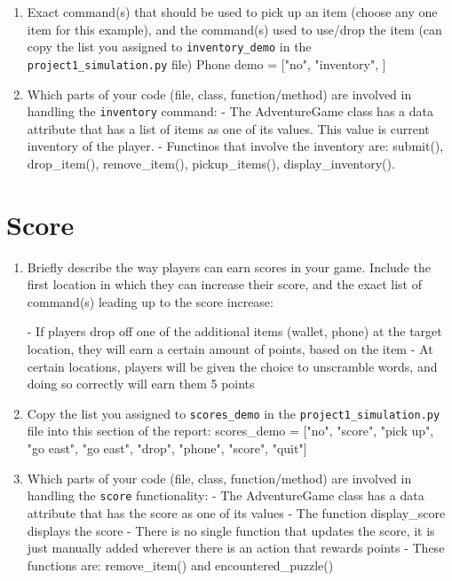\documentclass[11pt]{article}
\begin{document}
\begin{enumerate}
    \item Exact command(s) that should be used to pick up an item (choose any one item for this example), and the command(s) used to use/drop the item (can copy the list you assigned to \texttt{inventory\_demo} in the \texttt{project1\_simulation.py} file)
        Phone demo = ["no", "inventory", ]
    \item Which parts of your code (file, class, function/method) are involved in handling the \texttt{inventory} command:
        - The AdventureGame class has a data attribute that has a list of items as one of its values. This value is current inventory of the player.
        - Functinos that involve the inventory are: submit(), drop_item(), remove_item(), pickup_items(), display_inventory().
\end{enumerate}

\section*{Score}
\begin{enumerate}

    \item Briefly describe the way players can earn scores in your game. Include the first location in which they can increase their score, and the exact list of command(s) leading up to the score increase:

        - If players drop off one of the additional items (wallet, phone) at the target location, they will earn a certain
        amount of points, based on the item
        - At certain locations, players will be given the choice to unscramble words, and doing so correctly will earn them
        5 points

    \item Copy the list you assigned to \texttt{scores\_demo} in the \texttt{project1\_simulation.py} file into this section of the report:
        scores_demo = ["no", "score", "pick up", "go east", "go east", "drop", "phone", "score", "quit"]

    \item Which parts of your code (file, class, function/method) are involved in handling the \texttt{score} functionality:
        - The AdventureGame class has a data attribute that has the score as one of its values
        - The function display_score displays the score
        - There is no single function that updates the score, it is just manually added wherever there is an action that rewards points
        - These functions are: remove_item() and encountered_puzzle()
\end{enumerate}
\end{document}
